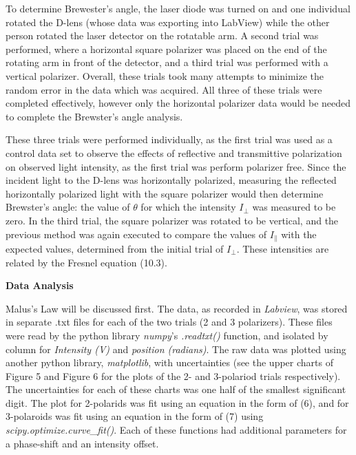 \documentclass[11pt]{article}
\begin{document}
\begin{multicols}{2}
    To determine Brewester's angle, the laser diode was turned on and one individual rotated the D-lens (whose data was exporting into LabView) while the other person rotated the laser detector on the rotatable arm. A second trial was performed, where a horizontal square polarizer was placed on the end of the rotating arm in front of the detector, and a third trial was performed with a vertical polarizer. Overall, these trials took many attempts to minimize the random error in the data which was acquired. All three of these trials were completed effectively, however only the horizontal polarizer data would be needed to complete the Brewster's angle analysis. 

    These three trials were performed individually, as the first trial was used as a control data set to observe the effects of reflective and transmittive polarization on observed light intensity, as the first trial was perform polarizer free. Since the incident light to the D-lens was horizontally polarized, measuring the reflected horizontally polarized light with the square polarizer would then determine Brewster's angle: the value of $\theta$ for which the intensity $I_{\perp}$ was measured to be zero. In the third trial, the square polarizer was rotated to be vertical, and the previous method was again executed to compare the values of $I_{\parallel}$ with the expected values, determined from the initial trial of $I_{\perp}$. These intensities are related by the Fresnel equation (10.3). 



    

    \vspace{10pt}

     \selectfont \textbf{Data Analysis}
    
     \selectfont 
    
    Malus's Law will be discussed first. The data, as recorded in \textit{Labview}, was stored in separate .txt files for each of the two trials (2 and 3 polarizers). 
    These files were read by the python library \textit{numpy}'s \textit{.readtxt()} function, and isolated by column for \textit{Intensity (V)} and \textit{position (radians)}.
    The raw data was plotted using another python library, \textit{matplotlib}, with uncertainties (see the upper charts of Figure 5 and Figure 6 for the plots of the 2- and 3-polariod trials respectively).
    The uncertainties for each of these charts was one half of the smallest significant digit.
    The plot for 2-polarids was fit using an equation in the form of (6), and for 3-polaroids was fit using an equation in the form of (7) using \textit{scipy.optimize.curve\_fit()}. 
    Each of these functions had additional parameters for a phase-shift and an intensity offset.  


\end{multicols}
\end{document}
